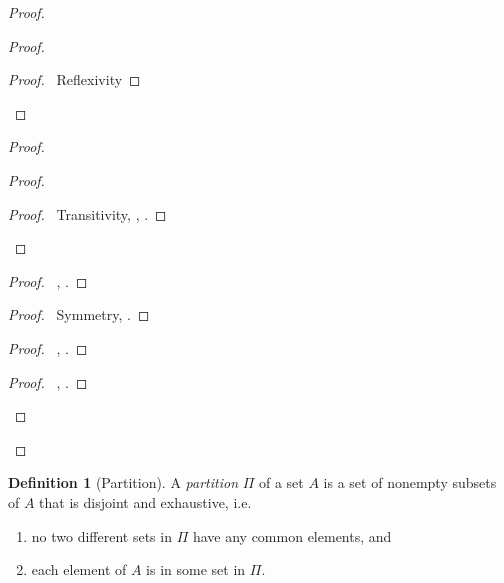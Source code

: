 \documentclass{book}
\let\qed\relax
\theoremstyle{definition}
\newtheorem{df}[ax]{Definition}
\begin{document}
\begin{proof}
\pf
{}
\begin{proof}
	\begin{proof}
		\pf\ Reflexivity
	\end{proof}
\end{proof}
\begin{proof}
	\begin{proof}
		\begin{proof}
			\pf\ Transitivity, , .
		\end{proof}
	\end{proof}
	\begin{proof}
		\pf\ , .
	\end{proof}
	\begin{proof}
		\pf\ Symmetry, .
	\end{proof}
	\begin{proof}
		\pf\ , .
	\end{proof}
	\begin{proof}
		\pf\ , .
	\end{proof}
\end{proof}
\qed
\end{proof}

\begin{df}[Partition]
A \emph{partition} $\Pi$ of a set $A$ is a set of nonempty subsets of $A$ that is disjoint and exhaustive, i.e.
\begin{enumerate}
\item no two different sets in $\Pi$ have any common elements, and
\item each element of $A$ is in some set in $\Pi$.
\end{enumerate}
\end{df}
\end{document}
